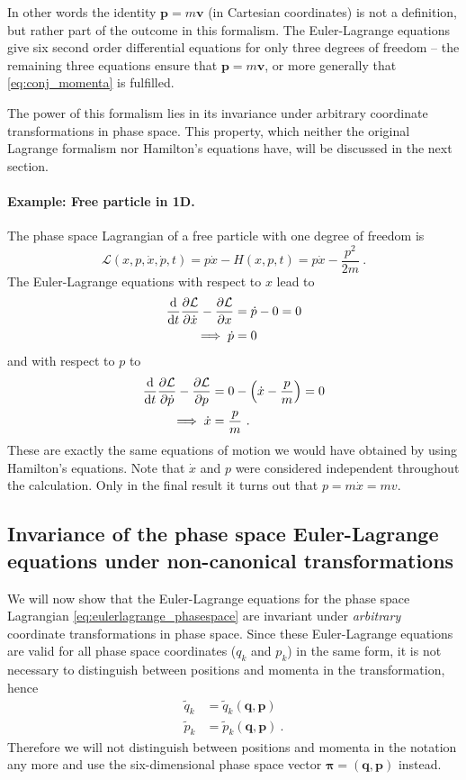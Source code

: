 \documentclass{scrartcl}
\renewcommand{\vec}[1]{\boldsymbol{#1}}
\newcommand{\ham}{H}
\newcommand{\PSL}{\mathcal{L}}
\begin{document}
In other words the identity $\vec{p} = m\vec{v}$ (in Cartesian coordinates) is not a definition, but rather part of the outcome in this formalism. The Euler-Lagrange equations give six second order differential equations for only three degrees of freedom -- the remaining three equations ensure that $\vec{p} = m\vec{v}$, or more generally that \eqref{eq:conj_momenta} is fulfilled.

The power of this formalism lies in its invariance under arbitrary coordinate transformations in phase space. This property, which neither the original Lagrange formalism nor Hamilton's equations have, will be discussed in the next section.

\paragraph{Example: Free particle in 1D.} The phase space Lagrangian of a free particle with one degree of freedom is
\begin{equation*}
\PSL(x,p,\dot{x},\dot{p},t) = p\dot{x} - \ham(x,p,t) = p\dot{x} - \frac{p^2}{2m} \ .
\end{equation*}
The Euler-Lagrange equations with respect to $x$ lead to
\begin{align*}
\dv{t}\pdv{\PSL}{\dot{x}} - \pdv{\PSL}{x} &= \dot{p} - 0 = 0 \\
\implies \dot{p} &= 0
\end{align*}
and with respect to $p$ to
\begin{align*}
\dv{t}\pdv{\PSL}{\dot{p}} - \pdv{\PSL}{p} &= 0 - \left(\dot{x}-\frac{p}{m}\right) = 0 \\
\implies \dot{x} &= \frac{p}{m} \ .
\end{align*}
These are exactly the same equations of motion we would have obtained by using Hamilton's equations. Note that $\dot{x}$ and $p$ were considered independent throughout the calculation. Only in the final result it turns out that $p = m\dot{x} = mv$. 

\subsection{Invariance of the phase space Euler-Lagrange equations under non-canonical transformations}

We will now show that the Euler-Lagrange equations for the phase space Lagrangian \eqref{eq:eulerlagrange_phasespace} are invariant under \emph{arbitrary} coordinate transformations in phase space. Since these Euler-Lagrange equations are valid for all phase space coordinates ($q_k$ and $p_k$) in the same form, it is not necessary to distinguish between positions and momenta in the transformation, hence
\begin{align*}
\tilde{q}_k &= \tilde{q}_k(\vec{q},\vec{p}) \\
\tilde{p}_k &= \tilde{p}_k(\vec{q},\vec{p}) \ .
\end{align*}
Therefore we will not distinguish between positions and momenta in the notation any more and use the six-dimensional phase space vector $\vec{\pi} = (\vec{q},\vec{p})$ instead.
\end{document}
